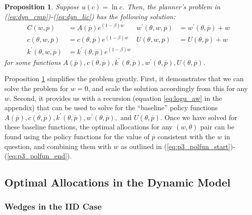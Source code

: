 \documentclass[11pt]{article}
\newtheorem{proposition}{Proposition}
\begin{document}
\begin{proposition}
    \label{prop:vf_homog}Suppose $u(c)=\ln c$. Then, the planner's
    problem in (\ref{eq:dyn_cmp})-(\ref{eq:dyn_lic}) has the following
    solution: 
    \begin{align}
    C\left(w,\overline{p}\right) & =A\left(\overline{p}\right)e^{\left(1-\beta\right)w} & w^{\prime}\left(\theta,w,\overline{p}\right) & =w^{\prime}\left(\theta,\overline{p}\right)+w\label{eq:p3_polfun_start}\\
    c\left(\theta,w,\overline{p}\right) & =c\left(\theta,\overline{p}\right)e^{\left(1-\beta\right)w} & U\left(\theta,w,\overline{p}\right) & =U\left(\theta,\overline{p}\right)+w\\
    k^{\prime}\left(\theta,w,\overline{p}\right) & =k^{\prime}\left(\theta,\overline{p}\right)e^{\left(1-\beta\right)w}\label{eq:p3_polfun_end}
    \end{align}
    for some functions $A\left(\overline{p}\right),c(\theta,\overline{p}),k^{\prime}(\theta,\overline{p}),w^{\prime}(\theta,\overline{p}),U(\theta,\overline{p})$. 
\end{proposition}

Proposition \ref{prop:vf_homog} simplifies the problem greatly. First,
it demonstrates that we can solve the problem for $w=0$, and scale
the solution accordingly from this for any $w$. Second, it provides
us with a recursion (equation \eqref{eq:logu_aw} in the appendix) that can be used to solve for the ``baseline'' policy functions $A\left(\overline{p}\right),c(\theta,\overline{p}),k^{\prime}(\theta,\overline{p}),w^{\prime}(\theta,\overline{p}),$
and $U(\theta,\overline{p})$. Once we have solved for these baseline
functions, the optimal allocations for any $\left(w,\theta\right)$
pair can be found using the policy functions for the value of $\overline{p}$
consistent with the $w$ in question, and combining them with $w$
as outlined in (\ref{eq:p3_polfun_start})-(\ref{eq:p3_polfun_end}). 

\subsection{Optimal Allocations in the Dynamic Model}
\subsubsection{Wedges in the IID Case}
\end{document}
